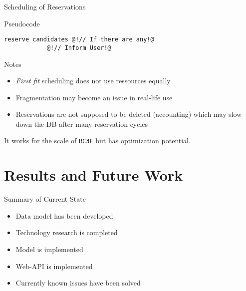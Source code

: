 \documentclass{beamer}
\newcommand{\rccce}{\texttt{RC3E}}
\begin{document}
\begin{frame}{Scheduling of Reservations}
\begin{block}{Pseudocode}
\begin{lstlisting}[style=http]
            reserve candidates @!// If there are any!@
            @!// Inform User!@
        \end{lstlisting}

        \end{block}

     \framebreak
     
     \begin{block}{Notes}
         \begin{itemize}
             \item \emph{First fit} scheduling does not use ressources equally
             \item Fragmentation may become an issue in real-life use
             \item Reservations are not supposed to be deleted (accounting) which may slow down the DB after many reservation cycles 
         \end{itemize}
     \end{block}
     
     It works for the scale of \rccce{} but has optimization potential.
        
    \end{frame}


\section{Results and Future Work}

    \begin{frame}{Summary of Current State}
    
        \begin{itemize}
            \item Data model has been developed
            \item Technology research is completed
            \item Model is implemented
            \item Web-API is implemented
            \item Currently known issues have been solved
        \end{itemize}
    
    \end{frame}
\end{document}

